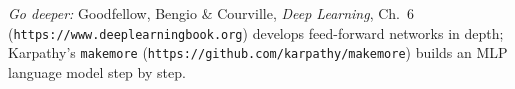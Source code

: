 \medskip
\noindent\textit{Go deeper:} Goodfellow, Bengio \& Courville, \emph{Deep
Learning}, Ch.~6 (\texttt{https://www.deeplearningbook.org}) develops
feed-forward networks in depth; Karpathy's \texttt{makemore}
(\texttt{https://github.com/karpathy/makemore}) builds an MLP language model
step by step.
